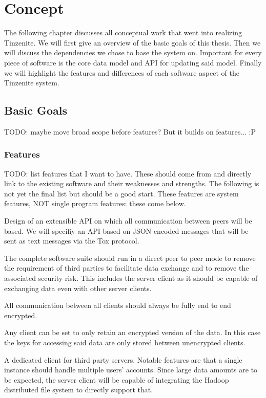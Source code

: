 \chapter{Concept}
\label{chap:concept}

The following chapter discusses all conceptual work that went into realizing Tinzenite.
We will first give an overview of the basic goals of this thesis.
Then we will discuss the dependencies we chose to base the system on.
Important for every piece of software is the core data model and API for updating said model.
Finally we will highlight the features and differences of each software aspect of the Tinzenite system.

\section{Basic Goals}

TODO: maybe move broad scope before features? But it builds on features... :P

\subsection{Features}

TODO: list features that I want to have.
These should come from and directly link to the existing software and their weaknesses and strengths.
The following is not yet the final list but should be a good start.
These features are system features, NOT single program features: these come below.

\begin{description}[leftmargin=2em,style=nextline,noitemsep,nolistsep]
\item[API]
    Design of an extensible API on which all communication between peers will be based.
    We will specifiy an API based on JSON encoded messages that will be sent as text messages via the Tox protocol.
\item[Peer to Peer Architecture]
    The complete software suite should run in a direct peer to peer mode to remove the requirement of third parties to facilitate data exchange and to remove the associated security risk.
    This includes the server client as it should be capable of exchanging data even with other server clients.
\item[Secure Transport]
    All communication between all clients should always be fully end to end encrypted.
\item[Client Encryption]
    Any client can be set to only retain an encrypted version of the data.
    In this case the keys for accessing said data are only stored between unencrypted clients.
\item[Server Client]
    A dedicated client for third party servers.
    Notable features are that a single instance should handle multiple users' accounts.
    Since large data amounts are to be expected, the server client will be capable of integrating the Hadoop distributed file system to directly support that.
\end{description}

